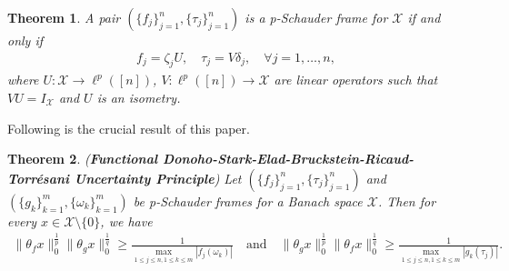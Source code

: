 \documentclass{amsart}
\newtheorem{theorem}{Theorem}[section]
\begin{document}
\begin{theorem}\label{THAFSCHAR}
	A pair  $(\{f_j\}_{j=1}^n, \{\tau_j\}_{j=1}^n)$ is a p-Schauder frame   for 	$\mathcal{X}$ if and only if 
	\begin{align*}
		f_j=\zeta_j U, \quad \tau_j=V\delta_j, \quad \forall j=1, \dots, n,
	\end{align*}  
	where $U:\mathcal{X} \rightarrow\ell^p([n])$, $ V: \ell^p([n])\to \mathcal{X}$ are linear operators such that $VU=I_\mathcal{X}$ and $U$ is an isometry.
\end{theorem}
Following is the crucial result of this paper. 
\begin{theorem} \label{FDS}(\textbf{Functional Donoho-Stark-Elad-Bruckstein-Ricaud-Torr\'{e}sani Uncertainty Principle}) 
Let $(\{f_j\}_{j=1}^n, \{\tau_j\}_{j=1}^n)$ and $(\{g_k\}_{k=1}^m, \{\omega_k\}_{k=1}^m)$ be  p-Schauder frames  for a Banach space $\mathcal{X}$. Then for every $x \in \mathcal{X}\setminus\{0\}$,  we have 
	\begin{align}\label{FDSUNCE}
		\|\theta_f x\|_0^\frac{1}{p}\|\theta_g x\|_0^\frac{1}{q} \geq 	\frac{1}{\displaystyle\max_{1\leq j\leq n, 1\leq k\leq m}|f_j(\omega_k)|}\quad \text{and} \quad \|\theta_g x\|_0^\frac{1}{p}\|\theta_f x\|_0^\frac{1}{q}\geq \frac{1}{\displaystyle\max_{1\leq j\leq n, 1\leq k\leq m}|g_k(\tau_j)|}.
	\end{align}
\end{theorem}
\end{document}
